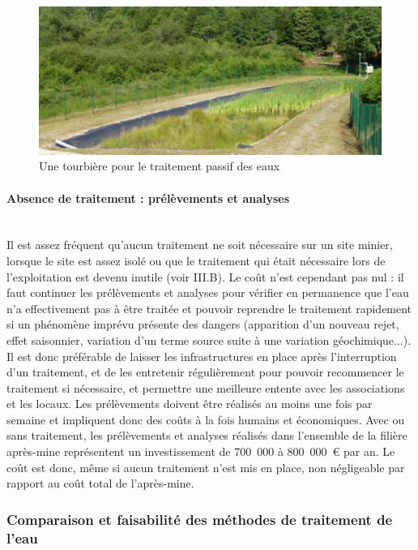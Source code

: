 \documentclass{article}
\begin{document}
\begin{figure}[H]
\centering
\includegraphics[width=0.7\linewidth]{III_A_4.png}
\caption{Une tourbière pour le traitement passif des eaux}
\label{fig:tourbiere}
\end{figure}


\paragraph{Absence de traitement : prélèvements et analyses \\ \\}

Il est assez fréquent qu’aucun traitement ne soit nécessaire sur un site minier, lorsque le site est assez isolé ou que le traitement qui était nécessaire lors de l’exploitation est devenu inutile (voir III.B). Le coût n’est cependant pas nul : il faut continuer les prélèvements et analyses pour vérifier en permanence que l’eau n’a effectivement pas à être traitée et pouvoir reprendre le traitement rapidement si un phénomène imprévu présente des dangers (apparition d’un nouveau rejet, effet saisonnier, variation d'un terme source suite à une variation géochimique...). Il est donc préférable de laisser les infrastructures en place après l'interruption d’un traitement, et de les entretenir régulièrement pour pouvoir recommencer le traitement si nécessaire, et permettre  une meilleure entente avec les associations et les locaux.  Les prélèvements doivent être réalisés au moins une fois par semaine et impliquent donc des coûts à la fois humains et économiques. Avec ou sans traitement, les prélèvements et analyses réalisés dans l’ensemble de la filière après-mine représentent un investissement de 700~000 à 800~000~\euro{} par an. Le coût est donc, même si aucun traitement n’est mis en place, non négligeable par rapport au coût total de l’après-mine. 

\subsubsection{Comparaison et faisabilité des méthodes de traitement de l'eau}
\end{document}
